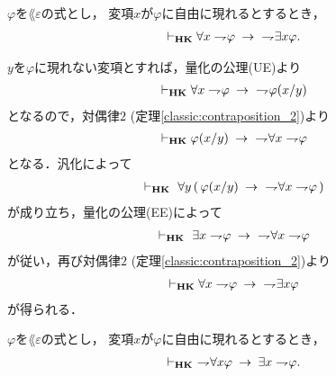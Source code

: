 	\begin{screen}
		\begin{thm}
		\label{classic:weak_De_Morgan_law_2}
			$\varphi$を$\lang{\varepsilon}$の式とし，
			変項$x$が$\varphi$に自由に現れるとするとき，
			\begin{align}
				\vdash_{{\scriptsize \mbox{{\bf HK}}}} \forall x \rightharpoondown\hspace{-0.25em} \varphi
				\hspace{0.25em}\rightarrow\hspace{0.25em}\ \rightharpoondown\hspace{-0.25em} \exists x \varphi.
			\end{align}
		\end{thm}
	\end{screen}
	
	\begin{sketch}
		$y$を$\varphi$に現れない変項とすれば，量化の公理(UE)より
		\begin{align}
			\vdash_{{\scriptsize \mbox{{\bf HK}}}} \forall x \rightharpoondown\hspace{-0.25em} \varphi \hspace{0.25em}\rightarrow\hspace{0.25em}\ \rightharpoondown\hspace{-0.25em} \varphi(x/y)
		\end{align}
		となるので，対偶律$2$ (定理\ref{classic:contraposition_2})より
		\begin{align}
			\vdash_{{\scriptsize \mbox{{\bf HK}}}} \varphi(x/y) \hspace{0.25em}\rightarrow\hspace{0.25em}\ \rightharpoondown\hspace{-0.25em} \forall x \rightharpoondown\hspace{-0.25em} \varphi
		\end{align}
		となる．汎化によって
		\begin{align}
			\vdash_{{\scriptsize \mbox{{\bf HK}}}}\ \forall y\, (\, \varphi(x/y) \hspace{0.25em}\rightarrow\hspace{0.25em}\ \rightharpoondown\hspace{-0.25em} \forall x \rightharpoondown\hspace{-0.25em} \varphi\, )
		\end{align}
		が成り立ち，量化の公理(EE)によって
		\begin{align}
			\vdash_{{\scriptsize \mbox{{\bf HK}}}}\ \exists x \rightharpoondown\hspace{-0.25em} \varphi \hspace{0.25em}\rightarrow\hspace{0.25em}\ \rightharpoondown\hspace{-0.25em} \forall x \rightharpoondown\hspace{-0.25em} \varphi
		\end{align}
		が従い，再び対偶律$2$ (定理\ref{classic:contraposition_2})より
		\begin{align}
			\vdash_{{\scriptsize \mbox{{\bf HK}}}} \forall x \rightharpoondown\hspace{-0.25em} \varphi \hspace{0.25em}\rightarrow\hspace{0.25em}\ \rightharpoondown\hspace{-0.25em} \exists x \varphi
		\end{align}
		が得られる．
		\QED
	\end{sketch}
	
	\begin{screen}
		\begin{thm}
		\label{classic:strong_De_Morgan_law_2}
			$\varphi$を$\lang{\varepsilon}$の式とし，
			変項$x$が$\varphi$に自由に現れるとするとき，
			\begin{align}
				\vdash_{{\scriptsize \mbox{{\bf HK}}}}\ \rightharpoondown\hspace{-0.25em} \forall x \varphi \hspace{0.25em}\rightarrow\hspace{0.25em} 
				\exists x \rightharpoondown\hspace{-0.25em} \varphi.
			\end{align}
		\end{thm}
	\end{screen}
	

